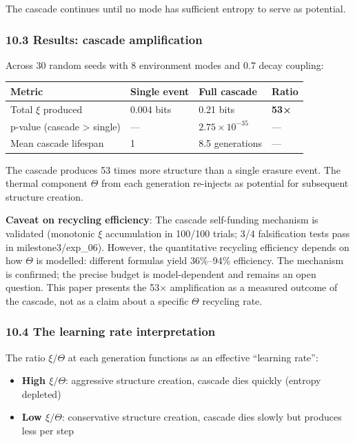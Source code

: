 \documentclass[
  11pt,
  a4paper]{article}
\providecommand{\tightlist}{%
  \setlength{\itemsep}{0pt}\setlength{\parskip}{0pt}}
\begin{document}
The cascade continues until no mode has sufficient entropy to serve as
potential.

\subsubsection{10.3 Results: cascade
amplification}\label{results-cascade-amplification}

Across 30 random seeds with 8 environment modes and 0.7 decay coupling:

\begin{longtable}[]{@{}llll@{}}
\toprule\noalign{}
Metric & Single event & Full cascade & Ratio \\
\midrule\noalign{}
\endhead
\bottomrule\noalign{}
\endlastfoot
Total \(\xi\) produced & 0.004 bits & 0.21 bits & \textbf{53×} \\
p-value (cascade \textgreater{} single) & --- & \(2.75 \times 10^{-35}\)
& --- \\
Mean cascade lifespan & 1 & 8.5 generations & --- \\
\end{longtable}

The cascade produces 53 times more structure than a single erasure
event. The thermal component \(\Theta\) from each generation re-injects
as potential for subsequent structure creation.

\textbf{Caveat on recycling efficiency}: The cascade self-funding
mechanism is validated (monotonic \(\xi\) accumulation in 100/100
trials; 3/4 falsification tests pass in milestone3/exp\_06). However,
the quantitative recycling efficiency depends on how \(\Theta\) is
modelled: different formulas yield 36\%--94\% efficiency. The mechanism
is confirmed; the precise budget is model-dependent and remains an open
question. This paper presents the 53× amplification as a measured
outcome of the cascade, not as a claim about a specific \(\Theta\)
recycling rate.

\subsubsection{10.4 The learning rate
interpretation}\label{the-learning-rate-interpretation}

The ratio \(\xi/\Theta\) at each generation functions as an effective
``learning rate'':

\begin{itemize}
\tightlist
\item
  \textbf{High \(\xi/\Theta\)}: aggressive structure creation, cascade
  dies quickly (entropy depleted)
\item
  \textbf{Low \(\xi/\Theta\)}: conservative structure creation, cascade
  dies slowly but produces less per step
\end{itemize}
\end{document}
